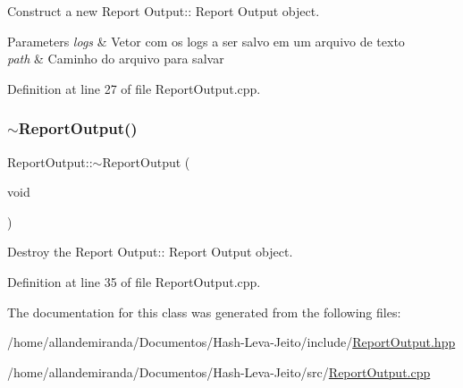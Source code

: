 Construct a new Report Output\+:\+: Report Output object. 


\begin{DoxyParams}{Parameters}
{\em logs} & Vetor com os logs a ser salvo em um arquivo de texto \\
\hline
{\em path} & Caminho do arquivo para salvar \\
\hline
\end{DoxyParams}


Definition at line 27 of file Report\+Output.\+cpp.

\mbox{\label{class_report_output_a6f255eea899e24768b5220ebe960ad6d}} 
\subsubsection{\texorpdfstring{$\sim$\+Report\+Output()}{~ReportOutput()}}
{\footnotesize\ttfamily Report\+Output\+::$\sim$\+Report\+Output (\begin{DoxyParamCaption}\item[{void}]{ }\end{DoxyParamCaption})}



Destroy the Report Output\+:\+: Report Output object. 



Definition at line 35 of file Report\+Output.\+cpp.



The documentation for this class was generated from the following files\+:\begin{DoxyCompactItemize}
\item 
/home/allandemiranda/\+Documentos/\+Hash-\/\+Leva-\/\+Jeito/include/\hyperlink{_report_output_8hpp}{Report\+Output.\+hpp}\item 
/home/allandemiranda/\+Documentos/\+Hash-\/\+Leva-\/\+Jeito/src/\hyperlink{_report_output_8cpp}{Report\+Output.\+cpp}\end{DoxyCompactItemize}
